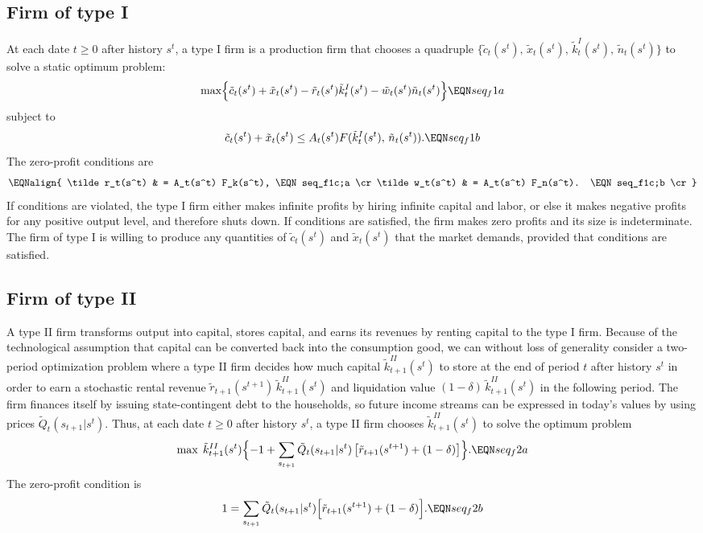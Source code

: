 \subsection{Firm of type I}\label{sec:FirmI}%
At each date $t \geq 0$ after history $s^t$,
a type I firm is a production firm that
chooses a quadruple $\{\tilde c_t(s^t),\, \tilde x_t(s^t), \,
\tilde k_t^I(s^t),\, \tilde n_t(s^t)\}$
to solve a static optimum problem:
$$ \max\Bigl\{ \tilde c_t(s^t) + \tilde x_t(s^t)
- \tilde r_t(s^t) \tilde k^I_t(s^t)
- \tilde w_t(s^t) \tilde n_t(s^t) \Bigr\}      \EQN seq_f1a  $$
subject to
$$ \tilde c_t(s^t) + \tilde x_t(s^t) \leq  A_t(s^t)
F( \tilde k^I_t(s^t),\, \tilde n_t(s^t) ). \EQN seq_f1b $$
The zero-profit conditions are
$$ \EQNalign{ \tilde r_t(s^t) & = A_t(s^t) F_k(s^t),  \EQN seq_f1c;a \cr
              \tilde w_t(s^t) & = A_t(s^t) F_n(s^t).  \EQN seq_f1c;b \cr} $$
If conditions  are violated, the type I firm
either makes infinite profits by hiring infinite capital
and labor, or else it makes negative profits for any positive
output level, and therefore shuts down.  If conditions 
are satisfied, the firm makes zero profits and its size is
indeterminate.  The firm of type I is willing to produce
any quantities of $\tilde c_t(s^t)$ and $\tilde x_t(s^t)$ that the
market demands, provided
that conditions  are satisfied.




\subsection{Firm of type II}\label{sec:FirmII}%
A type  II firm transforms output into capital, stores capital,
 and earns its revenues by renting
capital to the type I firm. Because of the technological
assumption that capital can be converted back into the consumption
good, we can without loss of generality consider a
two-period optimization problem where a type II firm decides how
much capital $\tilde k_{t+1}^{II}(s^t)$ to store at the end of
period $t$ after history $s^t$ in order to earn a stochastic
rental revenue $\tilde r_{t+1}(s^{t+1}) \,\tilde k_{t+1}^{II}(s^t)$
and liquidation value $(1-\delta) \,\tilde k_{t+1}^{II}(s^t)$
in the following period. The firm finances itself by issuing state-contingent
 debt to the households, so future income streams can
be expressed in today's values by using prices
$\tilde Q_t(s_{t+1} | s^t)$.  Thus, at each date $t \geq 0$ after
history $s^t$, a type II firm chooses $\tilde k_{t+1}^{II}(s^t)$
to solve the optimum problem
$$ \max   \; \tilde k_{t+1}^{II}(s^t) \Bigl\{ -1 +
\sum_{s_{t+1}} \tilde Q_t(s_{t+1} | s^t)
\left[ \tilde r_{t+1}(s^{t+1}) + (1-\delta)
                           \right]\Bigr\} .    \EQN seq_f2a  $$
The zero-profit condition is
$$ 1 = \sum_{s_{t+1}} \tilde Q_t(s_{t+1} | s^t)
\Bigl[ \tilde r_{t+1}(s^{t+1}) + (1-\delta)
                           \Bigr]. \EQN seq_f2b $$


